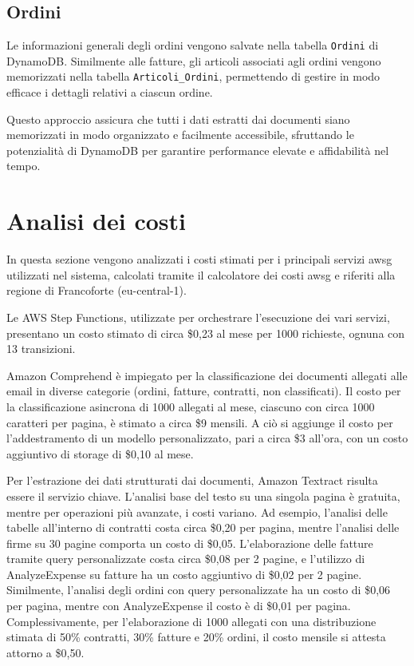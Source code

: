 \subsection{Ordini}
Le informazioni generali degli ordini vengono salvate nella tabella \texttt{Ordini} di DynamoDB. Similmente alle fatture, gli articoli associati agli ordini vengono memorizzati nella tabella \texttt{Articoli\_Ordini}, permettendo di gestire in modo efficace i dettagli relativi a ciascun ordine.

Questo approccio assicura che tutti i dati estratti dai documenti siano memorizzati in modo organizzato e facilmente accessibile, sfruttando le potenzialità di DynamoDB per garantire performance elevate e affidabilità nel tempo.

\section{Analisi dei costi}

In questa sezione vengono analizzati i costi stimati per i principali servizi \gls{awsg} utilizzati nel sistema, calcolati tramite il calcolatore dei costi \gls{awsg} e riferiti alla regione di Francoforte (eu-central-1).

Le AWS Step Functions, utilizzate per orchestrare l'esecuzione dei vari servizi, presentano un costo stimato di circa \$0,23 al mese per 1000 richieste, ognuna con 13 transizioni. 

Amazon Comprehend è impiegato per la classificazione dei documenti allegati alle email in diverse categorie (ordini, fatture, contratti, non classificati). Il costo per la classificazione asincrona di 1000 allegati al mese, ciascuno con circa 1000 caratteri per pagina, è stimato a circa \$9 mensili. A ciò si aggiunge il costo per l'addestramento di un modello personalizzato, pari a circa \$3 all'ora, con un costo aggiuntivo di storage di \$0,10 al mese.

Per l'estrazione dei dati strutturati dai documenti, Amazon Textract risulta essere il servizio chiave. L'analisi base del testo su una singola pagina è gratuita, mentre per operazioni più avanzate, i costi variano. Ad esempio, l'analisi delle tabelle all'interno di contratti costa circa \$0,20 per pagina, mentre l'analisi delle firme su 30 pagine comporta un costo di \$0,05. L'elaborazione delle fatture tramite query personalizzate costa circa \$0,08 per 2 pagine, e l'utilizzo di AnalyzeExpense su fatture ha un costo aggiuntivo di \$0,02 per 2 pagine. Similmente, l'analisi degli ordini con query personalizzate ha un costo di \$0,06 per pagina, mentre con AnalyzeExpense il costo è di \$0,01 per pagina. Complessivamente, per l'elaborazione di 1000 allegati con una distribuzione stimata di 50\% contratti, 30\% fatture e 20\% ordini, il costo mensile si attesta attorno a \$0,50.


